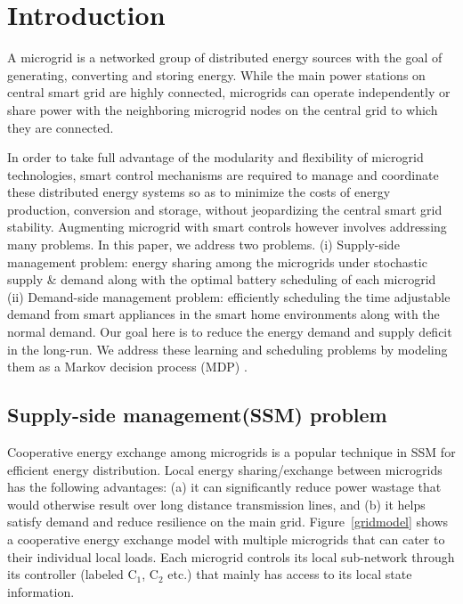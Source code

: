 \section{Introduction}

A microgrid is a networked group of distributed energy sources with the goal of generating, converting and storing energy. While the main power stations on central smart grid are highly connected, microgrids can operate independently or share power with the neighboring microgrid nodes \cite{farhangi2010path} on the central grid to which they are connected.

In order to take full advantage of the modularity and flexibility of microgrid technologies, smart control mechanisms are required to manage and coordinate these distributed energy systems so as to minimize the costs of energy production, conversion and storage, without jeopardizing the central smart grid stability. Augmenting microgrid with smart controls however involves addressing many problems. In this paper, we address two  problems. (i) Supply-side management problem: energy sharing among the microgrids under stochastic supply \& demand along with the optimal battery scheduling of each microgrid (ii) Demand-side management problem: efficiently scheduling the time adjustable demand from smart appliances in the smart home environments along with the normal demand. Our goal here is to reduce the energy demand and supply deficit in the long-run. We address these learning and scheduling problems by modeling them as a Markov decision process (MDP) \cite{puterman2014markov}.

\subsection{Supply-side management(SSM) problem}
Cooperative energy exchange among microgrids is a popular technique in SSM for efficient energy distribution.  Local energy sharing/exchange between microgrids has the following advantages:
(a) it can significantly reduce power wastage that would otherwise result over long distance transmission lines, and (b) it helps satisfy demand and reduce resilience on the main grid. Figure~\ref{gridmodel} shows a cooperative energy exchange model with multiple microgrids that can cater to their individual local loads. Each microgrid controls its local sub-network through its controller (labeled $\mbox{C}_1$, $\mbox{C}_2$ etc.) that mainly has access to its local state information.


